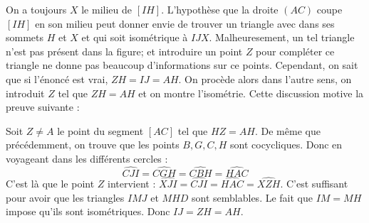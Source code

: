 \begin{sol}
\begin{center}
\end{center}

On a toujours $X$ le milieu de $[IH]$. L'hypothèse que la droite $(AC)$ coupe $[IH]$ en son milieu peut donner envie de trouver un triangle avec dans ses sommets $H$ et $X$ et qui soit isométrique à $IJX$. Malheuresement, un tel triangle n'est pas présent dans la figure; et introduire un point $Z$ pour compléter ce triangle ne donne pas beaucoup d'informations sur ce points. Cependant, on sait que si l'énoncé est vrai, $ZH=IJ=AH$. On procède alors dans l'autre sens, on introduit $Z$ tel que $ZH=AH$ et on montre l'isométrie. Cette discussion motive la preuve suivante :

Soit $Z\ne A$ le point du segment $[AC]$ tel que $HZ=AH$.
De même que précédemment, on trouve que les points $B,G,C,H$ sont cocycliques. Donc en voyageant dans les différents cercles : $$\widehat{CJI}=\widehat{CGH}=\widehat{CBH}=\widehat{HAC}$$
C'est là que le point $Z$ intervient : $\widehat{XJI}=\widehat{CJI}=\widehat{HAC}=\widehat{XZH}$. C'est suffisant pour avoir que les triangles $IMJ$ et $MHD$ sont semblables. Le fait que $IM=MH$ impose qu'ils sont isométriques. Donc $IJ=ZH=AH$.
\end{sol}


